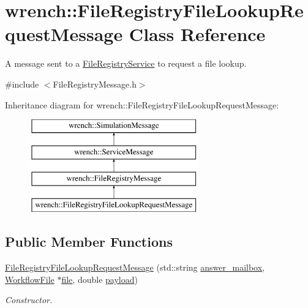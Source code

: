 \hypertarget{classwrench_1_1_file_registry_file_lookup_request_message}{}\section{wrench\+:\+:File\+Registry\+File\+Lookup\+Request\+Message Class Reference}
\label{classwrench_1_1_file_registry_file_lookup_request_message}


A message sent to a \hyperlink{classwrench_1_1_file_registry_service}{File\+Registry\+Service} to request a file lookup.  




{\ttfamily \#include $<$File\+Registry\+Message.\+h$>$}

Inheritance diagram for wrench\+:\+:File\+Registry\+File\+Lookup\+Request\+Message\+:\begin{figure}[H]
\begin{center}
\leavevmode
\includegraphics[height=4.000000cm]{classwrench_1_1_file_registry_file_lookup_request_message}
\end{center}
\end{figure}
\subsection*{Public Member Functions}
\begin{DoxyCompactItemize}
\item 
\hyperlink{classwrench_1_1_file_registry_file_lookup_request_message_a4945e659bceef2bf19d37a469d5bf79f}{File\+Registry\+File\+Lookup\+Request\+Message} (std\+::string \hyperlink{classwrench_1_1_file_registry_file_lookup_request_message_ae22012c8e5a15901991271f4b5c41d53}{answer\+\_\+mailbox}, \hyperlink{classwrench_1_1_workflow_file}{Workflow\+File} $\ast$\hyperlink{classwrench_1_1_file_registry_file_lookup_request_message_a53d0aa754b0de04293cb084486e10ca7}{file}, double \hyperlink{classwrench_1_1_simulation_message_a914f2732713f7c02898e66f05a7cb8a1}{payload})
\begin{DoxyCompactList}\small\item\em Constructor. \end{DoxyCompactList}\end{DoxyCompactItemize}

